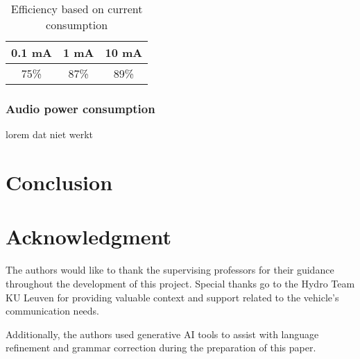 \documentclass[conference]{IEEEtran}
\begin{document}
\begin{table}[h]
  \centering
  \caption{Efficiency based on current consumption}
 \label{tab:power_suply_table}
  \begin{tabular}{|c|c|c|}
    \hline
    \textbf{0.1 mA} & \textbf{1 mA} & \textbf{10 mA} \\
    \hline
    75\% & 87\% & 89\% \\
    \hline
  \end{tabular}
\end{table}

\subsubsection{Audio power consumption}

lorem dat niet werkt


\section{Conclusion}

\section*{Acknowledgment}
The authors would like to thank the supervising professors for their guidance throughout the development of this project. Special thanks go to the Hydro Team KU Leuven for providing valuable context and support related to the vehicle's communication needs. 

Additionally, the authors used generative AI tools to assist with language refinement and grammar correction during the preparation of this paper.


\end{document}
